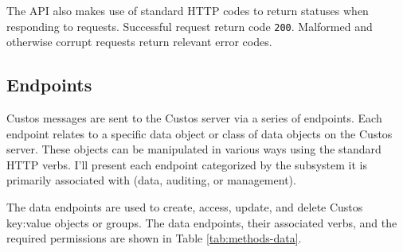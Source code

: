 The API also makes use of standard HTTP codes to return statuses when
responding to requests. Successful request return code
\texttt{200}. Malformed and otherwise corrupt requests return relevant
error codes.

\subsection{Endpoints}

Custos messages are sent to the Custos server via a series of
endpoints. Each endpoint relates to a specific data object or class
of data objects on the Custos server. These objects can be manipulated
in various ways using the standard HTTP verbs. I'll present each
endpoint categorized by the subsystem it is primarily associated with
(data, auditing, or management).

The data endpoints are used to create, access, update, and delete
Custos key:value objects or groups. The data endpoints, their
associated verbs, and the required permissions are shown in Table
\ref{tab:methods-data}.

